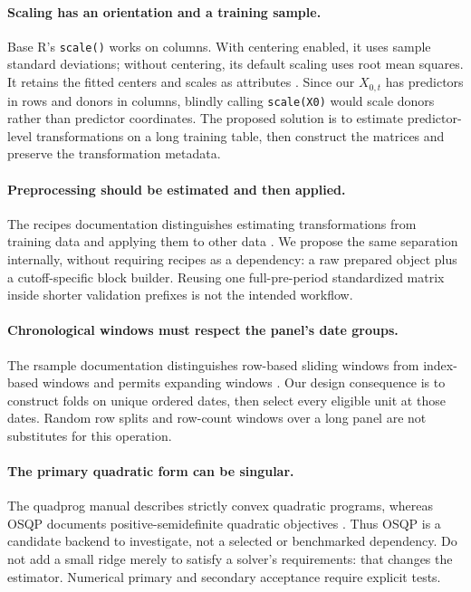 \documentclass[11pt]{article}
\begin{document}
\paragraph{Scaling has an orientation and a training sample.}
Base R's \texttt{scale()} works on columns. With centering enabled, it
uses sample standard deviations; without centering, its default scaling
uses root mean squares. It retains the fitted centers and scales as
attributes \cite{rscale}. Since our $X_{0,t}$ has predictors in rows and
donors in columns, blindly calling \texttt{scale(X0)} would scale donors
rather than predictor coordinates. The proposed solution is to estimate
predictor-level transformations on a long training table, then construct
the matrices and preserve the transformation metadata.

\paragraph{Preprocessing should be estimated and then applied.}
The recipes documentation distinguishes estimating transformations from
training data and applying them to other data \cite{recipes}. We propose
the same separation internally, without requiring recipes as a dependency:
a raw prepared object plus a cutoff-specific block builder. Reusing one
full-pre-period standardized matrix inside shorter validation prefixes is
not the intended workflow.

\paragraph{Chronological windows must respect the panel's date groups.}
The rsample documentation distinguishes row-based sliding windows from
index-based windows and permits expanding windows \cite{rsample}.
Our design consequence is to construct folds on unique ordered dates,
then select every eligible unit at those dates. Random row splits and
row-count windows over a long panel are not substitutes for this operation.

\paragraph{The primary quadratic form can be singular.}
The quadprog manual describes strictly convex quadratic programs, whereas
OSQP documents positive-semidefinite quadratic objectives
\cite{quadprog,osqp}. Thus OSQP is a candidate backend to investigate,
not a selected or benchmarked dependency. Do not add a small ridge merely
to satisfy a solver's requirements: that changes the estimator. Numerical
primary and secondary acceptance require explicit tests.
\end{document}
